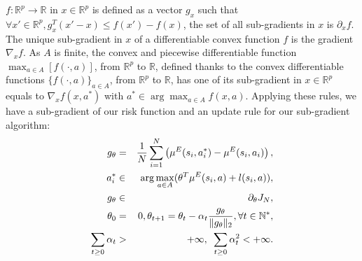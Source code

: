 \documentclass{article}
\begin{document}
$f:\mathbb{R}^p\rightarrow \mathbb{R}$ in $x\in\mathbb{R}^p$ is defined as a vector $g_x$ such that $\forall x' \in \mathbb{R}^p, g_x^T(x'-x)\leq f(x')-f(x)$, the set of all sub-gradients in $x$ is $\partial_xf$.
The unique sub-gradient in $x$ of a differentiable convex function $f$ is the gradient $\nabla_xf$. As $A$ is finite, the convex and piecewise differentiable function $\max_{a\in A}[f(\cdot,a)]$, from $\mathbb{R}^p$ to $\mathbb{R}$, defined thanks to the convex differentiable functions $\{f(\cdot,a)\}_{a\in A}$, from $\mathbb{R}^p$ to $\mathbb{R}$,
has one of its sub-gradient in $x\in\mathbb{R}^p$ equals to $\nabla_xf(x,a^*)$ with $a^*\in\arg\max_{a\in A}f(x,a)$.
Applying these rules, we have a sub-gradient of our risk function and an update rule for our sub-gradient algorithm:
\begin{eqnarray}
\label{algorithm}
g_{\theta} &=& {1\over N}\sum\limits_{i=1}^N\left(\mu^E(s_i,a^*_i) - \mu^E(s_i,a_i)\right),\\
a^*_i &\in& \arg\max_{a\in A}(\theta ^T \mu^E(s_i,a) + l(s_i,a)),\\
g_{\theta} &\in& \partial_\theta J_N,\\
\theta_{0}&=&0,\theta_{t+1}=\theta_t -\alpha_t\frac{g_{\theta}}{\|g_{\theta}\|_2},\forall t\in\mathbb{N}^*,\\
\sum_{t\geq0}\alpha_t&>&+\infty,\text{ }\sum_{t\geq0}\alpha_t^2<+\infty.
\end{eqnarray}
\end{document}
